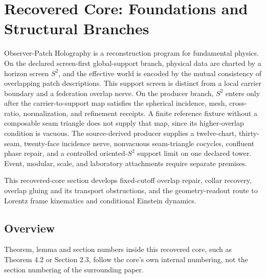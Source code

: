 \section{Recovered Core: Foundations and Structural Branches}\label{observer-patch-holography}

Observer-Patch Holography is a reconstruction program for fundamental physics. On the declared
screen-first global-support branch, physical data are charted by a horizon screen \(S^2\), and the
effective world is encoded by the mutual consistency of overlapping patch descriptions. This
support screen is distinct from a local carrier boundary and a federation overlap nerve. On the
producer branch, \(S^2\) enters only after the carrier-to-support map satisfies the spherical
incidence, mesh, cross-ratio, normalization, and refinement receipts. A finite reference
fixture without a composable seam triangle does not supply that map, since its
higher-overlap condition is vacuous. The source-derived producer supplies a
twelve-chart, thirty-seam, twenty-face incidence nerve, nonvacuous seam-triangle cocycles,
confluent phase repair, and a controlled oriented-\(S^2\) support limit on one declared tower.
Event, modular, scale, and laboratory attachments require separate premises.

This recovered-core section develops fixed-cutoff overlap repair, collar recovery, overlap
gluing and its transport obstructions, and the geometry-readout route to Lorentz frame
kinematics and conditional Einstein dynamics.

\subsection{Overview}\label{overview}

Theorem, lemma and section numbers inside this recovered core, such as
Theorem 4.2 or Section 2.3, follow the core's own internal numbering, not the
section numbering of the surrounding paper.

